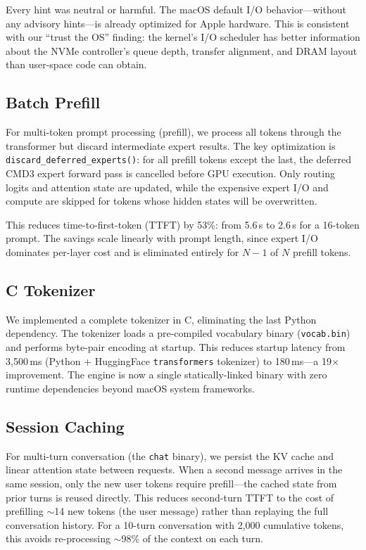 \documentclass[11pt,twocolumn]{article}
\begin{document}
Every hint was neutral or harmful.
The macOS default I/O behavior---without any advisory hints---is already optimized for Apple hardware.
This is consistent with our ``trust the OS'' finding: the kernel's I/O scheduler has better information about the NVMe controller's queue depth, transfer alignment, and DRAM layout than user-space code can obtain.

\subsection{Batch Prefill}
\label{sec:prefill}

For multi-token prompt processing (prefill), we process all tokens through the transformer but discard intermediate expert results.
The key optimization is \texttt{discard\_deferred\_experts()}: for all prefill tokens except the last, the deferred CMD3 expert forward pass is cancelled before GPU execution.
Only routing logits and attention state are updated, while the expensive expert I/O and compute are skipped for tokens whose hidden states will be overwritten.

This reduces time-to-first-token (TTFT) by 53\%: from 5.6\,s to 2.6\,s for a 16-token prompt.
The savings scale linearly with prompt length, since expert I/O dominates per-layer cost and is eliminated entirely for $N-1$ of $N$ prefill tokens.

\subsection{C Tokenizer}
\label{sec:tokenizer}

We implemented a complete tokenizer in C, eliminating the last Python dependency.
The tokenizer loads a pre-compiled vocabulary binary (\texttt{vocab.bin}) and performs byte-pair encoding at startup.
This reduces startup latency from 3{,}500\,ms (Python + HuggingFace \texttt{transformers} tokenizer) to 180\,ms---a 19$\times$ improvement.
The engine is now a single statically-linked binary with zero runtime dependencies beyond macOS system frameworks.

\subsection{Session Caching}
\label{sec:session_cache}

For multi-turn conversation (the \texttt{chat} binary), we persist the KV cache and linear attention state between requests.
When a second message arrives in the same session, only the new user tokens require prefill---the cached state from prior turns is reused directly.
This reduces second-turn TTFT to the cost of prefilling $\sim$14 new tokens (the user message) rather than replaying the full conversation history.
For a 10-turn conversation with 2{,}000 cumulative tokens, this avoids re-processing $\sim$98\% of the context on each turn.
\end{document}
